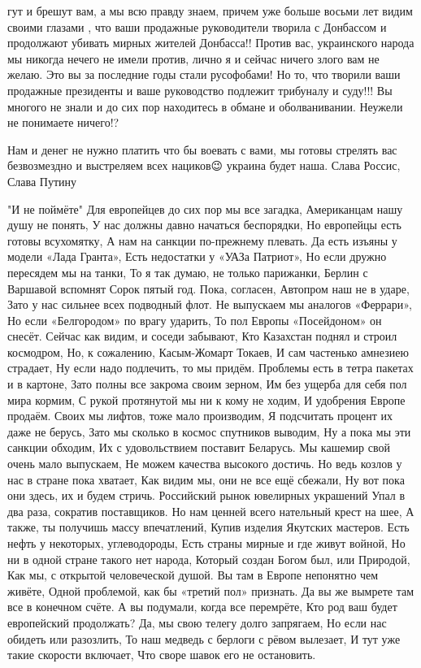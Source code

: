 гут и брешут вам, а мы всю правду знаем, причем уже больше восьми лет видим
своими глазами , что ваши продажные руководители творила с Донбассом и
продолжают убивать мирных жителей Донбасса!! Против вас, украинского народа мы
никогда нечего не имели против, лично я и сейчас ничего злого вам не желаю. Это
вы за последние годы стали русофобами! Но то, что творили ваши продажные
президенты и ваше руководство подлежит трибуналу и суду!!! Вы многого не знали
и до сих пор находитесь в обмане и оболванивании. Неужели не понимаете ничего!?

Нам и денег не нужно платить что бы воевать с вами, мы готовы стрелять вас
безвозмездно и выстреляем всех нациков😉 украина будет наша. Слава Россис,
Слава Путину

"И не поймёте"
Для европейцев до сих пор мы все загадка,
Американцам нашу душу не понять,
У нас должны давно начаться беспорядки,
Но европейцы есть готовы всухомятку,
А нам на санкции по-прежнему плевать.
Да есть изъяны у модели «Лада Гранта»,
Есть недостатки у «УАЗа Патриот»,
Но если дружно пересядем мы на танки,
То я так думаю, не только парижанки,
Берлин с Варшавой вспомнят Сорок пятый год.
Пока, согласен, Автопром наш не в ударе,
Зато у нас сильнее всех подводный флот.
Не выпускаем мы аналогов «Феррари»,
Но если «Белгородом» по врагу ударить,
То пол Европы «Посейдоном» он снесёт.
Сейчас как видим, и соседи забывают,
Кто Казахстан поднял и строил космодром,
Но, к сожалению, Касым-Жомарт Токаев,
И сам частенько амнезиею страдает,
Ну если надо подлечить, то мы придём.
Проблемы есть в тетра пакетах и в картоне,
Зато полны все закрома своим зерном,
Им без ущерба для себя пол мира кормим,
С рукой протянутой мы ни к кому не ходим,
И удобрения Европе продаём.
Своих мы лифтов, тоже мало производим,
Я подсчитать процент их даже не берусь,
Зато мы сколько в космос спутников выводим,
Ну а пока мы эти санкции обходим,
Их с удовольствием поставит Беларусь.
Мы кашемир свой очень мало выпускаем,
Не можем качества высокого достичь.
Но ведь козлов у нас в стране пока хватает,
Как видим мы, они не все ещё сбежали,
Ну вот пока они здесь, их и будем стричь.
Российский рынок ювелирных украшений
Упал в два раза, сократив поставщиков.
Но нам ценней всего нательный крест на шее,
А также, ты получишь массу впечатлений,
Купив изделия Якутских мастеров.
Есть нефть у некоторых, углеводороды,
Есть страны мирные и где живут войной,
Но ни в одной стране такого нет народа,
Который создан Богом был, или Природой,
Как мы, с открытой человеческой душой.
Вы там в Европе непонятно чем живёте,
Одной проблемой, как бы «третий пол» признать.
Да вы же вымрете там все в конечном счёте.
А вы подумали, когда все перемрёте,
Кто род ваш будет европейский продолжать?
Да, мы свою телегу долго запрягаем,
Но если нас обидеть или разозлить,
То наш медведь с берлоги с рёвом вылезает,
И тут уже такие скорости включает,
Что своре шавок его не остановить.
